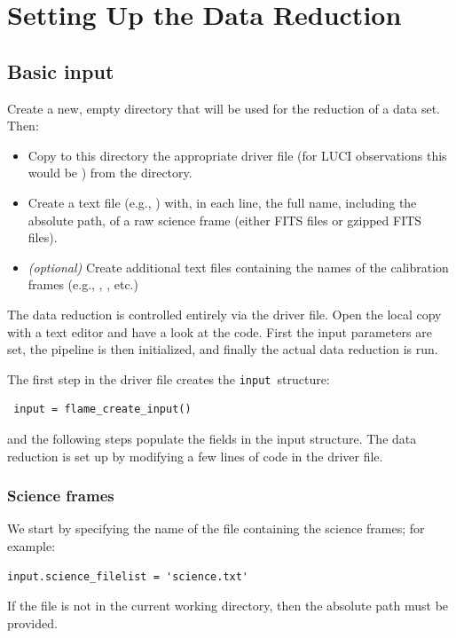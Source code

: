 \documentclass[a4paper]{article}
\newcommand{\inp}{\texttt{input}}
\begin{document}
\begin{sloppypar}
\section{Setting Up the Data Reduction}
\label{sec:setup}


\subsection{Basic input}

Create a new, empty directory that will be used for the reduction of a data set. Then:
\begin{itemize}
\item Copy to this directory the appropriate driver file (for LUCI observations this would be ) from the  directory.
\item Create a text file (e.g., ) with, in each line, the full name, including the absolute path, of a raw science frame (either FITS files or gzipped FITS files).
\item \emph{(optional)} Create additional text files containing the names of the calibration frames (e.g., , , etc.)
\end{itemize}

The data reduction is controlled entirely via the driver file. Open the local copy with a text editor and have a look at the code. First the input parameters are set, the pipeline is then initialized, and finally the actual data reduction is run.

The first step in the driver file creates the \inp\ structure:
\begin{lstlisting}
 input = flame_create_input()
\end{lstlisting}
and the following steps populate the fields in the input structure. The data reduction is set up by modifying a few lines of code in the driver file.

\subsubsection{Science frames}
We start by specifying the name of the file containing the science frames; for example:
\begin{lstlisting}
input.science_filelist = 'science.txt'
\end{lstlisting}
If the file is not in the current working directory, then the absolute path must be provided.


\end{sloppypar}
\end{document}
